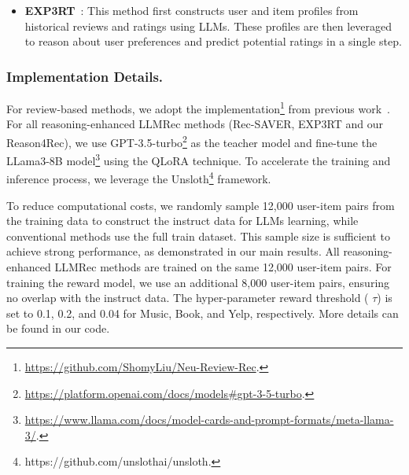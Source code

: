 \begin{itemize}[leftmargin=*]

    \item \textbf{EXP3RT}~\cite{expert}: 
    This method first constructs user and item profiles from historical reviews and ratings using LLMs. These profiles are then leveraged to reason about user preferences and predict potential ratings in a single step.
    
\end{itemize}

\subsubsection{\textbf{Implementation Details.}}
For review-based methods, we adopt the implementation\footnote{\url{https://github.com/ShomyLiu/Neu-Review-Rec}.} from previous work~\cite{liu2019nrpa}.
For all reasoning-enhanced LLMRec methods (\ie Rec-SAVER, EXP3RT and our Reason4Rec), we use GPT-3.5-turbo\footnote{\url{https://platform.openai.com/docs/models\#gpt-3-5-turbo}.} as the teacher model and fine-tune the LLama3-8B model\footnote{\url{https://www.llama.com/docs/model-cards-and-prompt-formats/meta-llama-3/}.} using the QLoRA technique. To accelerate the training and inference process, we leverage the Unsloth\footnote{https://github.com/unslothai/unsloth.} framework.


To reduce computational costs, we randomly sample 12,000 user-item pairs from the training data to construct the instruct data for LLMs learning, while conventional methods use the full train dataset. This sample size is sufficient to achieve strong performance, as demonstrated in our main results. All reasoning-enhanced LLMRec methods are trained on the same 12,000 user-item pairs. For training the reward model, we use an additional 8,000 user-item pairs, ensuring no overlap with the instruct data. The hyper-parameter reward threshold (
$\tau$) is set to 0.1, 0.2, and 0.04 for Music, Book, and Yelp, respectively. More details can be found in our code.





